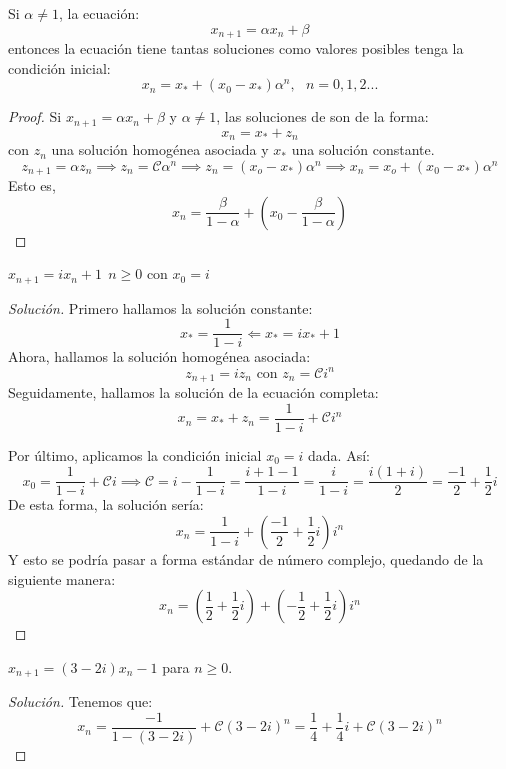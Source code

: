 \begin{nprop}
	Si $\alpha \ne 1$, la ecuación:
	\[
	x_{n+1} = \alpha x_n + \beta
	\]
	entonces la ecuación tiene tantas soluciones como valores posibles tenga la condición inicial:
	\[
	x_n = x_* + (x_0-x_*)\alpha^n , \ \ \ n=0,1,2...
	\]

	\begin{proof}
	Si $x_{n+1} = \alpha x_n + \beta$ y $\alpha \ne 1$, las soluciones de son de la forma:
	\[
	x_n = x_*+z_n
	\]
	con $z_n$ una solución homogénea asociada y $x_*$ una solución constante.
	\[
	z_{n+1} = \alpha z_n \implies z_{n} = \mathcal{C}\alpha^n \implies z_n = (x_o - x_*)\alpha^n \implies x_n = x_o + (x_0 - x_*)\alpha^n
	\]
	Esto es,
	$$x_n = \frac{\beta}{1-\alpha}+\left(x_0- \frac{\beta}{1-\alpha}\right)$$
\end{proof}

\end{nprop}


\begin{ejemplo}
	$x_{n+1}=ix_n+1 \ \ n \geq 0$ con $x_0=i$
	\begin{proof}[Solución]
	Primero hallamos la solución constante:
	\[
	x_* = \frac{1}{1-i} \Leftarrow x_* = ix_* +1
	\]
	Ahora, hallamos la solución homogénea asociada:
	\[
	z_{n+1} = iz_n \text{ con $z_n = \mathcal{C}i^n$}
	\]
	Seguidamente, hallamos la solución de la ecuación completa:
	\[
	x_n = x_* + z_n = \frac{1}{1-i}+ \mathcal{C}i^n
	\]

	Por último, aplicamos la condición inicial $x_0=i$ dada. Así:
	\[
	x_0 = \frac{1}{1-i}+ \mathcal{C}i \implies \mathcal{C} = i-\frac{1}{1-i} =  \frac{i+1-1}{1-i} = \frac{i}{1-i} = \frac{i(1+i)}{2} = \frac{-1}{2}+ \frac{1}{2}i
	\]
	De esta forma, la solución sería:
	\[
	x_n = \frac{1}{1-i} + \left(\frac{-1}{2}+ \frac{1}{2}i\right)i^n
	\]
	Y esto se podría pasar a forma estándar de número complejo, quedando de la siguiente manera:
	$$x_n=\left(\frac{1}{2} + \frac{1}{2}i\right) + \left(-\frac{1}{2} + \frac{1}{2}i\right)i^n$$
\end{proof}
\end{ejemplo}

\begin{ejemplo}[2]
	$x_{n+1}=(3-2i)x_n -1$ para $n\geq 0$.
	\begin{proof}[Solución]
	Tenemos que:
	\[
	x_n = \frac{-1}{1-(3-2i)}+\mathcal{C}(3-2i)^n = \frac{1}{4} + \frac{1}{4}i + \mathcal{C}(3-2i)^n
	\]
\end{proof}
\end{ejemplo}

